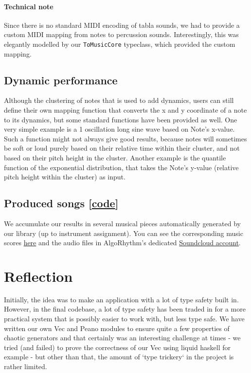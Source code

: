 \documentclass[11pt,a4paper]{article}
\newcommand{\icode}[1]{\texttt{#1}}
\begin{document}
\paragraph{Technical note} Since there is no standard MIDI encoding of tabla sounds, we had to provide a custom MIDI mapping from notes to percussion sounds. Interestingly, this was elegantly modelled by our \icode{ToMusicCore} typeclass, which provided the custom mapping.

\subsection{Dynamic performance}
Although the clustering of notes that is used to add dynamics, users can still define their own mapping function that converts the x and y coordinate of a note to its dynamics, but some standard functions have been provided as well. One very simple example is a 1 oscillation long sine wave based on Note's x-value. Such a function might not always give good results, because notes will sometimes be soft or loud purely based on their relative time within their cluster, and not based on their pitch height in the cluster. Another example is the quantile function of the exponential distribution, that takes the Note's y-value (relative pitch height within the cluster) as input.

\subsection{Produced songs [\href{https://github.com/omelkonian/AlgoRhythm/blob/master/AlgoRhythm/app/Main.hs}{code}]} We accumulate our results in several musical pieces automatically generated by our library (up to instrument assignment). You can see the corresponding music scores \href{https://github.com/omelkonian/AlgoRhythm/tree/master/output}{here} and the audio files in AlgoRhythm's dedicated \href{https://soundcloud.com/algo-rhythm-haskell/sets}{Soundcloud account}.

\section{Reflection}
Initially, the idea was to make an application with a lot of type safety built in. However, in the final codebase, a lot of type safety has been traded in for a more practical system that is possibly easier to work with, but less type safe. We have written our own Vec and Peano modules to ensure quite a few properties of chaotic generators and that certainly was an interesting challenge at times - we tried (and failed) to prove the correctness of our Vec using liquid haskell for example - but other than that, the amount of `type trickery` in the project is rather limited.
\end{document}
